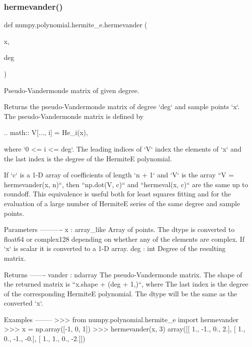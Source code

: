 \subsubsection{\texorpdfstring{hermevander()}{hermevander()}}
{\footnotesize\ttfamily def numpy.\+polynomial.\+hermite\+\_\+e.\+hermevander (\begin{DoxyParamCaption}\item[{}]{x,  }\item[{}]{deg }\end{DoxyParamCaption})}

\begin{DoxyVerb}Pseudo-Vandermonde matrix of given degree.

Returns the pseudo-Vandermonde matrix of degree `deg` and sample points
`x`. The pseudo-Vandermonde matrix is defined by

.. math:: V[..., i] = He_i(x),

where `0 <= i <= deg`. The leading indices of `V` index the elements of
`x` and the last index is the degree of the HermiteE polynomial.

If `c` is a 1-D array of coefficients of length `n + 1` and `V` is the
array ``V = hermevander(x, n)``, then ``np.dot(V, c)`` and
``hermeval(x, c)`` are the same up to roundoff. This equivalence is
useful both for least squares fitting and for the evaluation of a large
number of HermiteE series of the same degree and sample points.

Parameters
----------
x : array_like
    Array of points. The dtype is converted to float64 or complex128
    depending on whether any of the elements are complex. If `x` is
    scalar it is converted to a 1-D array.
deg : int
    Degree of the resulting matrix.

Returns
-------
vander : ndarray
    The pseudo-Vandermonde matrix. The shape of the returned matrix is
    ``x.shape + (deg + 1,)``, where The last index is the degree of the
    corresponding HermiteE polynomial.  The dtype will be the same as
    the converted `x`.

Examples
--------
>>> from numpy.polynomial.hermite_e import hermevander
>>> x = np.array([-1, 0, 1])
>>> hermevander(x, 3)
array([[ 1., -1.,  0.,  2.],
       [ 1.,  0., -1., -0.],
       [ 1.,  1.,  0., -2.]])\end{DoxyVerb}
 \mbox{\label{namespacenumpy_1_1polynomial_1_1hermite__e_afb0e7245b51ef3a40a800c85525fca8b}} 

